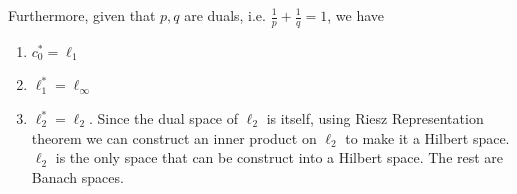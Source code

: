 	Furthermore, given that $p, q$ are duals, i.e. $\frac{1}{p} + \frac{1}{q} = 1$, we have 
	\begin{enumerate}
			\item $c_0^* = \ell_1$
			\item $\ell_1^* = \ell_\infty$ 
			\item $\ell_2^* = \ell_2$. Since the dual space of $\ell_2$ is itself, using Riesz Representation theorem we can construct an inner product on $\ell_2$ to make it a Hilbert space. $\ell_2$ is the only space that can be construct into a Hilbert space. The rest are Banach spaces. 
	\end{enumerate}

